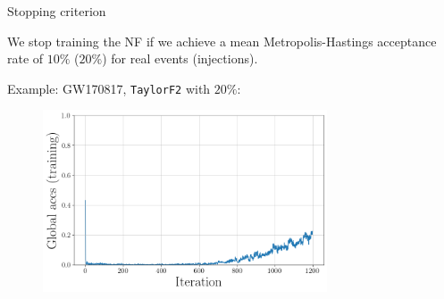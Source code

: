 \documentclass[usenames,dvipsnames,t]{beamer}
\begin{document}
\begin{frame}{Stopping criterion}

  \def\x{2mm}

  We stop training the NF if we achieve a mean Metropolis-Hastings acceptance rate of $10\%$ ($20\%$) for real events (injections).

  \vspace{\x}

  Example: GW170817, \texttt{TaylorF2} with $20\%$: 

  \vspace{\x}

  \begin{figure}
    \centering
    \includegraphics[width=0.75\textwidth]{Figures/global_accs_training.png}
  \end{figure}
\end{frame}
\end{document}
